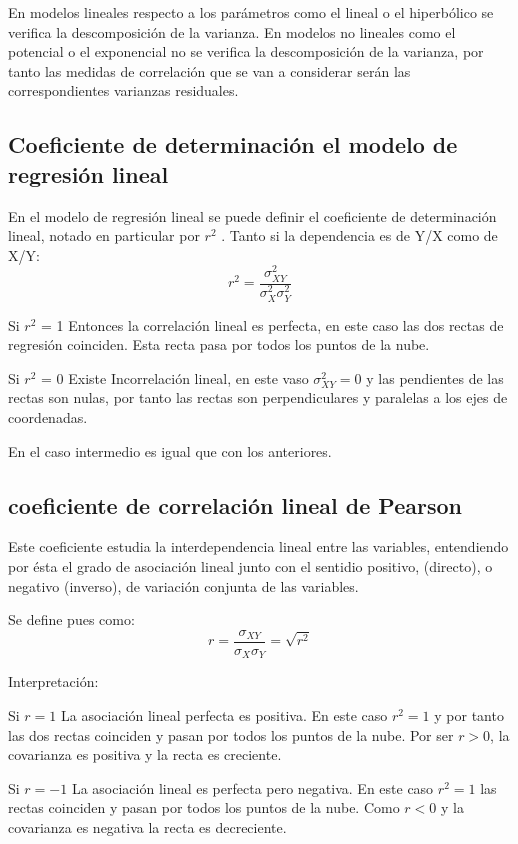 \documentclass{article}
\begin{document}
En modelos lineales respecto a los parámetros como el lineal o el hiperbólico se verifica la descomposición de la varianza. En modelos no lineales como el potencial o el exponencial no se verifica la descomposición de la varianza, por tanto las medidas de correlación que se van a considerar serán las correspondientes varianzas residuales.


\subsection{Coeficiente de determinación el modelo de regresión lineal}
En el modelo de regresión lineal se puede definir el coeficiente de determinación lineal, notado en particular por $r^2$ . Tanto si la dependencia es de Y/X como de X/Y:
$$ r^2 = \frac{\sigma_{XY}^2}{ \sigma_{X}^2 \sigma_{Y}^2 } $$

Si $r^2$ = 1 Entonces la correlación lineal es perfecta, en este caso las dos rectas de regresión coinciden. Esta recta pasa por todos los puntos de la nube.

Si $r^2$ = 0 Existe Incorrelación lineal, en este vaso $\sigma_{XY}^2 = 0$ y las pendientes de las rectas son nulas, por tanto las rectas son perpendiculares y paralelas a los ejes de coordenadas.

En el caso intermedio es igual que con los anteriores.

\subsection{coeficiente de correlación lineal de Pearson}

Este coeficiente estudia la interdependencia lineal entre las variables, entendiendo por ésta el grado de asociación lineal junto con el sentidio positivo, (directo), o negativo (inverso), de variación conjunta de las variables.

Se define pues como:
$$ r = \frac{\sigma_{XY}}{\sigma_{X} \sigma_{Y}}  = \sqrt{r^2}$$

Interpretación:

Si $r = 1$ La asociación lineal perfecta es positiva. En este caso $r^2 = 1$ y por tanto las dos rectas coinciden y pasan por todos los puntos de la nube. Por ser $r > 0$, la covarianza es positiva y la recta es creciente.

Si $r= -1$ La asociación lineal es perfecta pero negativa. En este caso $r^2 = 1$ las rectas coinciden y pasan por todos los puntos de la nube. Como $r < 0$ y la covarianza es negativa la recta es decreciente.
\end{document}
